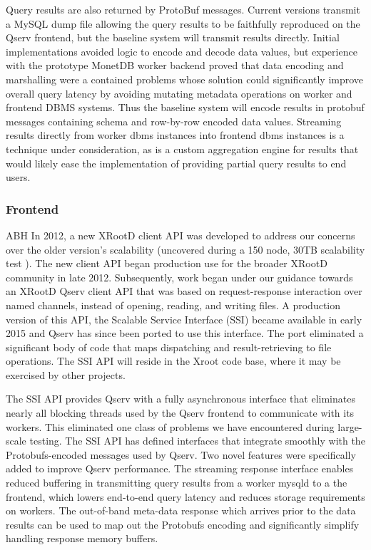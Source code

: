 \documentclass[DM,lsstdraft,toc]{lsstdoc}
\begin{document}
Query results are also returned by ProtoBuf messages. Current versions
transmit a MySQL dump file allowing the query results to be faithfully
reproduced on the Qserv frontend, but the baseline system will transmit
results directly. Initial implementations avoided logic to encode and
decode data values, but experience with the prototype MonetDB worker
backend proved that data encoding and marshalling were a contained
problems whose solution could significantly improve overall query
latency by avoiding mutating metadata operations on worker and frontend
DBMS systems. Thus the baseline system will encode results in protobuf
messages containing schema and row-by-row encoded data values. Streaming
results directly from worker dbms instances into frontend dbms instances
is a technique under consideration, as is a custom aggregation engine
for results that would likely ease the implementation of providing
partial query results to end users.

\subsubsection{Frontend}\label{frontend}

ABH In 2012, a new XRootD client API was
developed to address our concerns over the older version's scalability
(uncovered during a 150 node, 30TB scalability test ). The new client API
began production use for the broader XRootD
community in late 2012. Subsequently, work began under our guidance
towards an XRootD Qserv client API that was
based on request-response interaction over named channels, instead of
opening, reading, and writing files. A production version of this API,
the Scalable Service Interface (SSI) became available in early
2015 and Qserv has since been ported to use this interface. The port
eliminated a significant body of code that maps dispatching and
result-retrieving to file operations. The SSI API will reside
in the Xroot code base, where it may be exercised by other projects.

The SSI API provides Qserv with a fully asynchronous interface
that eliminates nearly all blocking threads used by the Qserv frontend
to communicate with its workers. This eliminated one class of problems
we have encountered during large-scale testing. The SSI API has
defined interfaces that integrate smoothly with the Protobufs-encoded
messages used by Qserv. Two novel features were specifically added to
improve Qserv performance. The streaming response interface enables
reduced buffering in transmitting query results from a worker mysqld to
a the frontend, which lowers end-to-end query latency and reduces
storage requirements on workers. The out-of-band meta-data response
which arrives prior to the data results can be used to map out the
Protobufs encoding and significantly simplify handling response memory
buffers.
\end{document}
